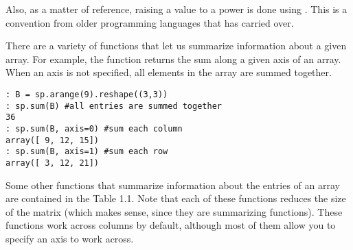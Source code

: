 Also, as a matter of reference, raising a value to a power is done using \li{**}. This is a convention from older programming languages that has carried over.

There are a variety of functions that let us summarize information about a given
array. For example, the  function returns the sum along a given axis of an array.  When an axis is not specified, all elements in the array are summed together.
\begin{lstlisting}
: B = sp.arange(9).reshape((3,3))
: sp.sum(B) #all entries are summed together
36
: sp.sum(B, axis=0) #sum each column
array([ 9, 12, 15])
: sp.sum(B, axis=1) #sum each row
array([ 3, 12, 21])     
\end{lstlisting}

Some other functions that summarize information about the entries of an array
are contained in the Table 1.1. Note that each of these functions reduces the
size of the matrix (which makes sense, since they are summarizing functions).
These functions work across columns by default, although most of them allow you
to specify an axis to work across.


